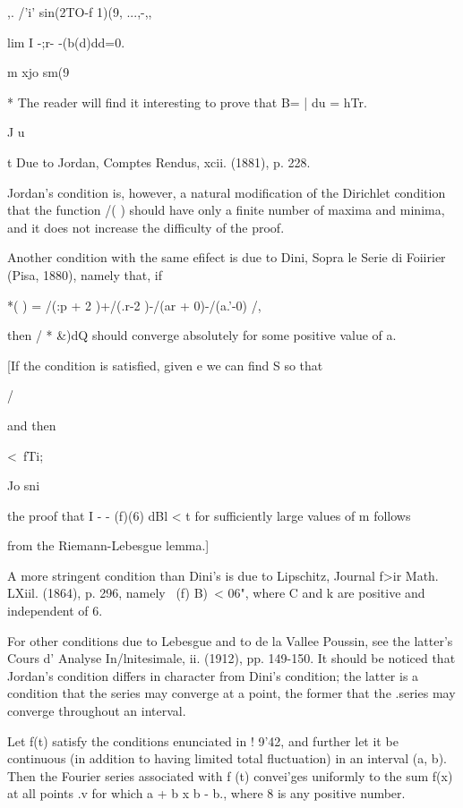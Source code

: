 ,. /'i' sin(2TO-f 1)(9, ...,-,,

lim I -;r- -(b(d)dd=0.

m xjo sm(9

* The reader will find it interesting to prove that B= | du = hTr.

J u

t Due to Jordan, Comptes Rendus, xcii. (1881), p. 228.

%
%

Jordan's condition is, however, a natural modification of the
Dirichlet condition that the function /( ) should have only a finite
number of maxima and minima, and it does not increase the difficulty
of the proof.

Another condition with the same efifect is due to Dini, Sopra le Serie
di Foiirier (Pisa, 1880), namely that, if

*( ) = /(:p + 2 )+/(.r-2 )-/(ar + 0)-/(a.'-0) /,

then / * \&)dQ should converge absolutely for some positive value of
a.

[If the condition is satisfied, given e we can find S so that

/

and then

<\ fTi;

Jo sni

the proof that I - - (f)(6) dBl < t for sufficiently large values of m
follows

from the Riemann-Lebesgue lemma.]

A more stringent condition than Dini's is due to Lipschitz, Journal
f>ir Math. LXiil. (1864), p. 296, namely \ (f) B)\ < 06", where C and
k are positive and independent of 6.

For other conditions due to Lebesgue and to de la Vallee Poussin, see
the latter's Cours d' Analyse In/lnitesimale, ii. (1912), pp. 149-150.
It should be noticed that Jordan's condition differs in character from
Dini's condition; the latter is a condition that the series may
converge at a point, the former that the .series may converge
throughout an interval.

Let f(t) satisfy the conditions enunciated in ! 9'42, and further let
it be continuous (in addition to having limited total fluctuation) in
an interval (a, b). Then the Fourier series associated with f (t)
convei'ges uniformly to the sum f(x) at all points .v for which a + b
x b - b., where 8 is any positive number.


